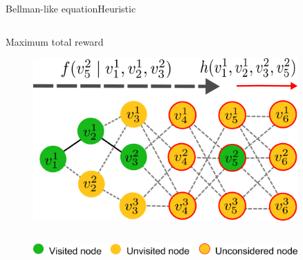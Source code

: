 \begin{frame}{Bellman-like equation}{Heuristic}
\begin{columns}
		\begin{block}{Maximum total reward}
			\begin{figure}
				\centering
				\includegraphics[width = 0.9\textwidth]{./figure/DefineFuncP}
			\end{figure}
		\end{block}
	\end{columns}
	
	\begin{figure}
		\centering
		\includegraphics[width = 0.9\textwidth]{./figure/DefineFuncHelp}
	\end{figure}
	
\end{frame}

